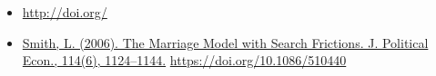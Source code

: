 \begin{rebox}
\small
\begin{flushleft}
\begin{itemize}
	\renewcommand{\labelitemi}{$\rightarrow$}
    \item {\href{\replicationURL}{\small \sffamily \replicationCITE}} {\href{http://doi.org/\replicationDOI}{\small \sffamily http://doi.org/\replicationDOI}} 
    \item {\href{https://www.ssc.wisc.edu/~lones/wp-content/uploads/2016/12/marriage-JPE.pdf}{\small \sffamily Smith, L. (2006). The Marriage Model with Search Frictions. J. Political Econ., 114(6), 1124–1144.}} {\href{https://doi.org/10.1086/510440}{\small \sffamily https://doi.org/10.1086/510440}}
  \end{itemize}\par
\end{flushleft}
\end{rebox}
